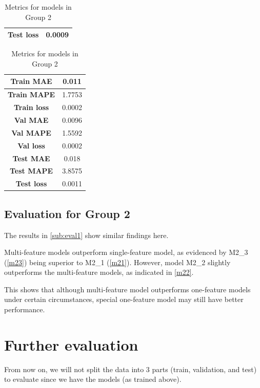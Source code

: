 \begin{enumerate}
\begin{table}[H]
\begin{minipage}{0.3\textwidth}
\begin{tabular}{|c|c|}
				\hline
				\textbf{Test loss}  & 0.0009 \\
				\hline
			\end{tabular}
			\label{m22}
		\end{minipage}
		\begin{minipage}{0.3\textwidth}
			\centering
			\begin{tabular}{|c|c|}
				\hline
				\textbf{Train MAE}  & 0.011  \\
				\hline
				\textbf{Train MAPE} & 1.7753 \\
				\hline
				\textbf{Train loss} & 0.0002 \\
				\hline
				\textbf{Val MAE}    & 0.0096 \\
				\hline
				\textbf{Val MAPE}   & 1.5592 \\
				\hline
				\textbf{Val loss}   & 0.0002 \\
				\hline
				\textbf{Test MAE}   & 0.018  \\
				\hline
				\textbf{Test MAPE}  & 3.8575 \\
				\hline
				\textbf{Test loss}  & 0.0011 \\
				\hline
			\end{tabular}
			\label{m23}
		\end{minipage}
		\caption{Metrics for models in Group 2}
	\end{table}
\end{enumerate}

\subsection{Evaluation for Group 2}
The results in \autoref{sub:eval1} show similar findings here.

Multi-feature models outperform single-feature model, as evidenced by M2\_3 (\autoref{m23})
being superior to M2\_1 (\autoref{m21}). However, model M2\_2 slightly outperforms the multi-feature models, as indicated in \autoref{m22}.

This shows that although multi-feature model outperforms one-feature models under certain circumstances, special one-feature model may still have better performance.

\section{Further evaluation}
From now on, we will not split the data into 3 parts (train, validation, and test) to evaluate since we have the models (as trained above).

